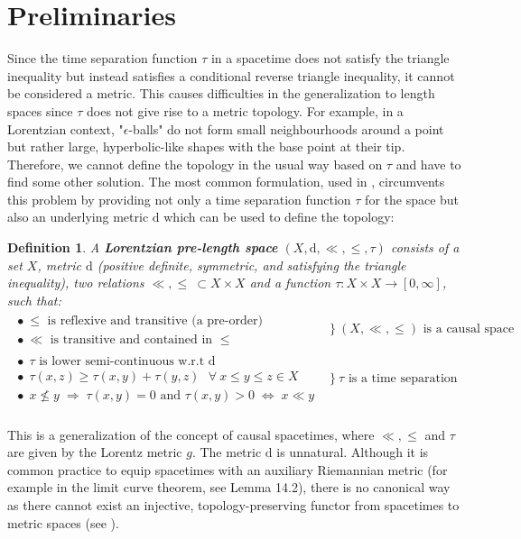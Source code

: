 \documentclass[11pt, a4paper]{article} %
\newcommand{\dd}{\text{d}} %
\newtheorem{definition}{Definition}[section]
\theoremstyle{plain} %
\newcommand{\eqval}{\; \Leftrightarrow \;}
\newcommand{\imply}{\; \Rightarrow \;}
\begin{document}
\section{Preliminaries}
Since the time separation function $\tau$ in a spacetime does not satisfy the triangle inequality but instead satisfies a conditional reverse triangle inequality, it cannot be considered a metric. This causes difficulties in the generalization to length spaces since $\tau$ does not give rise to a metric topology.  For example, in a Lorentzian context, "$\epsilon$-balls" do not form small neighbourhoods around a point but rather large, hyperbolic-like shapes with the base point at their tip. Therefore, we cannot define the topology in the usual way based on $\tau$ and have to find some other solution.
The most common formulation, used in \cite{kunzinger2018lorentz}, circumvents this problem by providing not only a time separation function $\tau$ for the space but also an underlying metric $\dd$ which can be used to define the topology:
\begin{definition}
A \textbf{Lorentzian pre-length space} $(X,\dd,\ll, \leq, \tau)$ consists of a set $X$, metric $\dd$ (positive definite, symmetric, and satisfying the triangle inequality), two relations $\ll, \leq\ \subset X\times X$ and a function $\tau: X\times X \to [ 0,\infty]$, such that:\\
$
\begin{array}{ll}
\begin{array}{l}
\bullet\ \leq \text{ is reflexive and transitive (a pre-order)} \\
\bullet\ \ll \text{ is transitive and contained in }\leq
\end{array}
& \bigg\}\ (X,\ll,\leq) \text{ is a causal space}\\
\begin{array}{l}
\bullet\ \ \tau \text{ is lower semi-continuous w.r.t d}\\
\bullet\ \ \tau(x,z) \geq \tau(x,y) + \tau(y,z) \ \ \ \forall\ x\leq y \leq z \in X\\
\bullet\ \ x\nleq y \imply \tau(x,y)=0 \text{ and } \tau(x,y)>0 \eqval x\ll y
\end{array}
& \Bigg \}\ \tau \text{ is a time separation function}\\
\end{array}
$
\end{definition}
This is a generalization of the concept of causal spacetimes, where $\ll, \leq$ and $\tau$ are given by the Lorentz metric $g$. The metric $\dd$ is unnatural. Although it is common practice to equip spacetimes with an auxiliary Riemannian metric (for example in the limit curve theorem, see \cite{GLG} Lemma 14.2), there is no canonical way as there cannot exist an injective, topology-preserving functor from spacetimes to metric spaces (see \cite{muller2019lorentzianGromovHausdorfAndFiniteness}).\\
\end{document}
